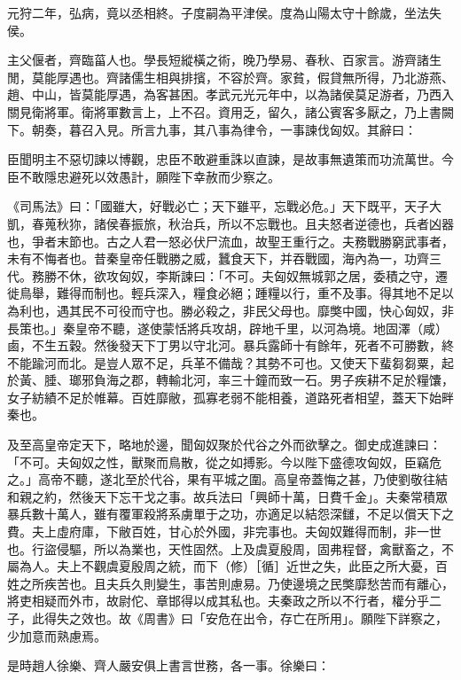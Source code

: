 \begin{pinyinscope}
元狩二年，弘病，竟以丞相終。子度嗣為平津侯。度為山陽太守十餘歲，坐法失侯。

主父偃者，齊臨菑人也。學長短縱橫之術，晚乃學易、春秋、百家言。游齊諸生閒，莫能厚遇也。齊諸儒生相與排擯，不容於齊。家貧，假貸無所得，乃北游燕、趙、中山，皆莫能厚遇，為客甚困。孝武元光元年中，以為諸侯莫足游者，乃西入關見衛將軍。衛將軍數言上，上不召。資用乏，留久，諸公賓客多厭之，乃上書闕下。朝奏，暮召入見。所言九事，其八事為律令，一事諫伐匈奴。其辭曰：

臣聞明主不惡切諫以博觀，忠臣不敢避重誅以直諫，是故事無遺策而功流萬世。今臣不敢隱忠避死以效愚計，願陛下幸赦而少察之。

《司馬法》曰：「國雖大，好戰必亡；天下雖平，忘戰必危。」天下既平，天子大凱，春蒐秋狝，諸侯春振旅，秋治兵，所以不忘戰也。且夫怒者逆德也，兵者凶器也，爭者末節也。古之人君一怒必伏尸流血，故聖王重行之。夫務戰勝窮武事者，未有不悔者也。昔秦皇帝任戰勝之威，蠶食天下，并吞戰國，海內為一，功齊三代。務勝不休，欲攻匈奴，李斯諫曰：「不可。夫匈奴無城郭之居，委積之守，遷徙鳥舉，難得而制也。輕兵深入，糧食必絕；踵糧以行，重不及事。得其地不足以為利也，遇其民不可役而守也。勝必殺之，非民父母也。靡獘中國，快心匈奴，非長策也。」秦皇帝不聽，遂使蒙恬將兵攻胡，辟地千里，以河為境。地固澤（咸）鹵，不生五穀。然後發天下丁男以守北河。暴兵露師十有餘年，死者不可勝數，終不能踰河而北。是豈人眾不足，兵革不備哉？其勢不可也。又使天下蜚芻芻粟，起於黃、腄、瑯邪負海之郡，轉輸北河，率三十鐘而致一石。男子疾耕不足於糧馕，女子紡績不足於帷幕。百姓靡敝，孤寡老弱不能相養，道路死者相望，蓋天下始畔秦也。

及至高皇帝定天下，略地於邊，聞匈奴聚於代谷之外而欲擊之。御史成進諫曰：「不可。夫匈奴之性，獸聚而鳥散，從之如搏影。今以陛下盛德攻匈奴，臣竊危之。」高帝不聽，遂北至於代谷，果有平城之圍。高皇帝蓋悔之甚，乃使劉敬往結和親之約，然後天下忘干戈之事。故兵法曰「興師十萬，日費千金」。夫秦常積眾暴兵數十萬人，雖有覆軍殺將系虜單于之功，亦適足以結怨深讎，不足以償天下之費。夫上虛府庫，下敝百姓，甘心於外國，非完事也。夫匈奴難得而制，非一世也。行盜侵驅，所以為業也，天性固然。上及虞夏殷周，固弗程督，禽獸畜之，不屬為人。夫上不觀虞夏殷周之統，而下（修）［循］近世之失，此臣之所大憂，百姓之所疾苦也。且夫兵久則變生，事苦則慮易。乃使邊境之民獘靡愁苦而有離心，將吏相疑而外市，故尉佗、章邯得以成其私也。夫秦政之所以不行者，權分乎二子，此得失之效也。故《周書》曰「安危在出令，存亡在所用」。願陛下詳察之，少加意而熟慮焉。

是時趙人徐樂、齊人嚴安俱上書言世務，各一事。徐樂曰：


\end{pinyinscope}
